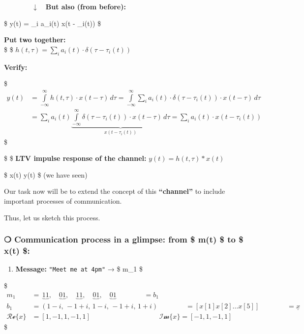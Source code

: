 \documentclass[11pt]{article}
\providecommand{\tightlist}{%
      \setlength{\itemsep}{0pt}\setlength{\parskip}{0pt}}
\begin{document}
{\(\qquad \qquad \downarrow \quad\)\textbf{But also (from before):}

\$ y(t) = \sum\_i a\_i(t) \cdot x(t - \tau\_i(t)) \$

\textbf{Put two together:}\\
\$ \implies \$ \(\boxed{
h(t, \tau) = \sum\limits_{i}  a_i(t) \cdot \delta(\tau - \tau_i(t))
}\)

\textbf{Verify:}

\$ \begin{align}
y(t) &= \int\limits_{-\infty}^{\infty} h(t, \tau) \cdot x(t - \tau) \, d\tau = \int\limits_{-\infty}^{\infty} \sum_i a_i(t) \cdot \delta(\tau - \tau_i(t)) \cdot x(t - \tau) \, d\tau \\
&= \sum\limits_{i} a_i(t) \underbrace{ \int\limits_{-\infty}^{\infty} \delta(\tau - \tau_i(t)) \cdot x(t - \tau) \, d\tau }_{x(t - \tau_i(t))}= \sum\limits_{i} a_i(t) \cdot x(t - \tau_i(t))
\end{align} \$

\$ \implies \$ \textbf{LTV impulse response of the channel:} \(\boxed{
y(t) = h(t, \tau) \ast x(t)
}\)

    \$ x(t) \xrightarrow{\qquad }  \xrightarrow{\qquad } y(t) \$ (we
have seen)

Our task now will be to extend the concept of this \textbf{``channel''}
to include important processes of communication.

Thus, let us sketch this process.

    \subsubsection{\texorpdfstring{❍ \textbf{Communication process in a
glimpse: from \$ m(t) \$ to \$ x(t)
\$:}}{❍ Communication process in a glimpse: from \$ m(t) \$ to \$ x(t) \$:}}\label{communication-process-in-a-glimpse-from-mt-to-xt}

\begin{enumerate}
\def\labelenumi{\arabic{enumi}.}
\tightlist
\item
  \textbf{Message:} \texttt{"Meet\ me\ at\ 4pm"} → \$ m\_1 \$
\end{enumerate}

\$ \begin{align*}
m_1 &= \, \underbrace{11}, \quad \underbrace{01}, \quad \underbrace{11}, \quad \underbrace{01}, \quad \underbrace{01} \qquad \qquad = b_1 \\
b_1 &= (1 - i, \, -1 + i, \, 1 - i, \, -1 + i, \, 1 + i ) \qquad \qquad = [x[1]  x[2]  \ldots  x[5]] \qquad  \qquad  = \underline{x} \\
\mathcal{Re}\{x\} &= [1, -1, 1, -1, 1] \qquad \qquad \qquad \qquad \qquad \mathcal{Im}\{x\} = [-1, 1, -1, 1]
\end{align*} \$

}
\end{document}
